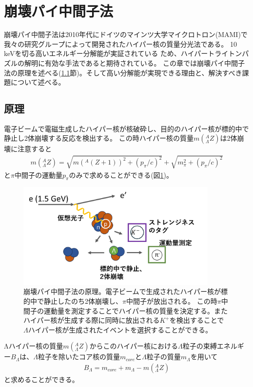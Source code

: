 \documentclass[a4paper,11pt,uplatex]{jsbook}
\begin{document}
\section{崩壊パイ中間子法}\label{DPS}
崩壊パイ中間子法は2010年代にドイツのマインツ大学マイクロトロン(MAMI)で我々の研究グループによって開発されたハイパー核の質量分光法である\cite{esserObservation4Hyperhydrogen2015}。
10 keVを切る高いエネルギー分解能が実証されている\cite{Schulz2015} ため、ハイパートライトンパズルの解明に有効な手法であると期待されている。
この章では崩壊パイ中間子法の原理を述べる(\ref{sec:dps principle}節)。そして高い分解能が実現できる理由と、解決すべき課題について述べる。
\subsection{原理}\label{sec:dps principle}
電子ビームで電磁生成したハイパー核が核破砕し、目的のハイパー核が標的中で静止し2体崩壊する反応を検出する。
この時ハイパー核の質量$m(^A_{\Lambda}Z)$は2体崩壊に注意すると
\begin{eqnarray}
  m(^A_{\Lambda}Z) = \sqrt{m(^A(Z+1))^2 + (p_\pi/c)^2} + \sqrt{m_\pi^2 + (p_\pi/c)^2} \label{mass formula}
\end{eqnarray}
と$\pi$中間子の運動量$p_\pi$のみで求めることができる(図\ref{fig:DPS})。
\begin{figure}[H]
  \centering
  \includegraphics[width=10cm]{image/1-DPS.png}
  \caption[崩壊パイ中間子法の原理]{崩壊パイ中間子法の原理。電子ビームで生成されたハイパー核が標的中で静止したのち2体崩壊し、$\pi$中間子が放出される。
  この時$\pi$中間子の運動量を測定することでハイパー核の質量を決定する。またハイパー核が生成する際に同時に放出される$K^+$を検出することで
  $\Lambda$ハイパー核が生成されたイベントを選択することができる。}\label{fig:DPS}
\end{figure}

Λハイパー核の質量$m(^A_\Lambda Z)$からこのハイパー核における$\Lambda$粒子の束縛エネルギー$B_\Lambda$は、$\Lambda$粒子を除いたコア核の質量$m_{core}$と$\Lambda$粒子の質量$m_\Lambda$を用いて
\begin{eqnarray}
  B_\Lambda = m_{core} + m_\Lambda - m(^A_\Lambda Z) \label{binding energy formula}
\end{eqnarray}
と求めることができる。
\end{document}
